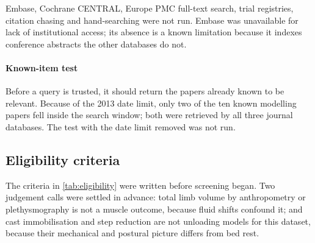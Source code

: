 Embase, Cochrane CENTRAL, Europe PMC full-text search, trial registries, citation chasing and hand-searching were
not run. Embase was unavailable for lack of institutional access; its absence is a known limitation because it
indexes conference abstracts the other databases do not.

\paragraph{Known-item test} Before a query is trusted, it should return the papers already known to be relevant.
Because of the 2013 date limit, only two of the ten known modelling papers fell inside the search window; both were
retrieved by all three journal databases. The test with the date limit removed was not run.

\subsection{Eligibility criteria}

The criteria in \cref{tab:eligibility} were written before screening began. Two judgement calls were settled in
advance: total limb volume by anthropometry or plethysmography is not a muscle outcome, because fluid shifts
confound it; and cast immobilisation and step reduction are not unloading models for this dataset, because their
mechanical and postural picture differs from bed rest.

